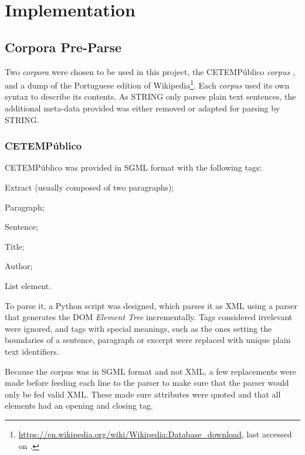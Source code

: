 \chapter{Implementation}
\label{ch:implementation}

\section{Corpora Pre-Parse}

Two \emph{corpora} were chosen to be used in this project, the CETEMPúblico 
\emph{corpus} \citep{rocha2000cetempublico}, and a dump of the Portuguese 
edition of 
Wikipedia\footnote{\url{https://en.wikipedia.org/wiki/Wikipedia:Database_download}, last accessed on .}. Each \emph{corpus} used its own 
syntax to describe its contents. As \ac{STRING} only parses plain text 
sentences, the additional meta-data provided was either removed or adapted for 
parsing by \ac{STRING}.

\subsection{CETEMPúblico}

CETEMPúblico was provided in \ac{SGML} format with the following tags:

\begin{description}[labelwidth=3em]
 \item [\texttt{ext}] Extract (usually composed of two paragraphs);
 \item [\texttt{p}]   Paragraph;
 \item [\texttt{s}]   Sentence;
 \item [\texttt{t}]   Title;
 \item [\texttt{a}]   Author;
 \item [\texttt{li}]  List element.
\end{description}

To parse it, a Python script was designed, which parses it as \ac{XML} using a
parser that generates the \ac{DOM} \emph{Element Tree} incrementally. Tags
considered irrelevant were ignored, and tags with special meanings, such as the
ones setting the boundaries of a sentence, paragraph or excerpt were replaced
with unique plain text identifiers.

Because the corpus was in \ac{SGML} format and not \ac{XML}, a few replacements
were made before feeding each line to the parser to make sure that the parser 
would only be fed valid \ac{XML}. These made sure attributes were quoted and 
that all elements had an opening and closing tag.


